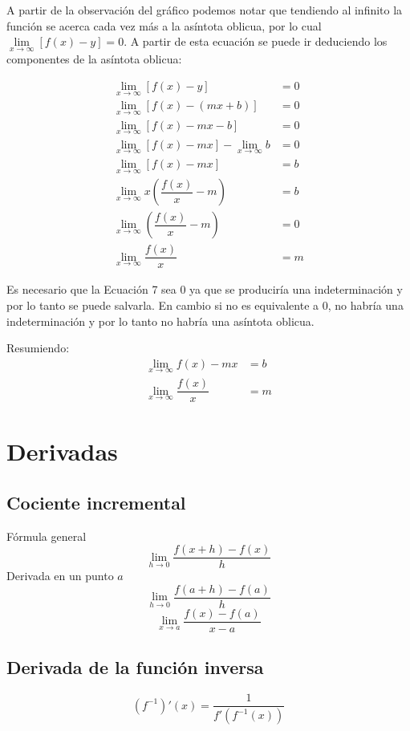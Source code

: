 \documentclass{article}
\begin{document}
A partir de la observación del gráfico podemos notar que tendiendo al infinito la función se acerca cada vez más a la asíntota oblicua, por lo cual $\displaystyle \lim \limits_{x \to \infty} \left[f(x)-y \right]=0$. 
A partir de esta ecuación se puede ir deduciendo los componentes de la asíntota oblicua:

\begin{align}
\lim \limits_{x \to \infty} \left[f(x)-y \right] &= 0 \\
\lim \limits_{x \to \infty} \left[f(x)- (mx+b)\right] &= 0 \\
\lim \limits_{x \to \infty} \left[f(x)-mx -b \right] &= 0 \\
\lim \limits_{x \to \infty} \left[f(x)-mx \right] - \lim \limits_{x \to \infty} b &= 0 \\
\lim \limits_{x \to \infty} \left[f(x)-mx \right] &= b \\
\lim \limits_{x \to \infty} x\left(\dfrac{f(x)}{x} - m\right)  &= b \\
\lim \limits_{x \to \infty} \left(\dfrac{f(x)}{x} - m\right)  &= 0 \\
\lim \limits_{x \to \infty} \dfrac{f(x)}{x}  &= m
\end{align}

Es necesario que la Ecuación 7 sea 0 ya que se produciría una indeterminación y por lo tanto se puede salvarla. En cambio si no es equivalente a 0, no habría una indeterminación y por lo tanto no habría una asíntota oblicua.

Resumiendo:
\begin{align*}
    \lim \limits_{x \to \infty} f(x)-mx &= b \\
    \lim \limits_{x \to \infty} \dfrac{f(x)}{x}  &= m
\end{align*}

\vspace{0.5cm}
\section{Derivadas}
\subsection{Cociente incremental}
Fórmula general
$$\lim \limits_{h \to 0} \dfrac{f(x+h)-f(x)}{h}$$
Derivada en un punto $a$
$$\lim \limits_{h \to 0} \dfrac{f(a+h)-f(a)}{h}$$
$$\lim \limits_{x \to a} \dfrac{f(x)-f(a)}{x-a}$$
\subsection{Derivada de la función inversa}
$$(f^{-1})'(x)=\dfrac{1}{f'(f^{-1}(x))}$$
\end{document}
